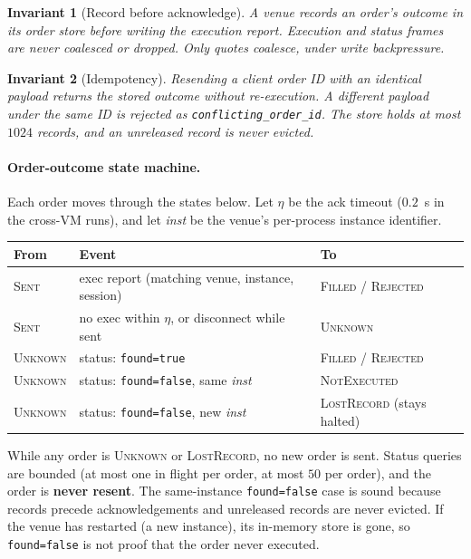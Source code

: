 \documentclass[11pt]{article}
\newtheorem{invariant}{Invariant}
\theoremstyle{remark}
\newcommand{\code}[1]{\texttt{#1}}
\begin{document}
\begin{invariant}[Record before acknowledge]
A venue records an order's outcome in its order store \emph{before} writing the execution
report. Execution and status frames are never coalesced or dropped. Only quotes coalesce, under
write backpressure.
\end{invariant}

\begin{invariant}[Idempotency]
Resending a client order ID with an identical payload returns the stored outcome without
re-execution. A different payload under the same ID is rejected as
\code{conflicting\_order\_id}. The store holds at most $1024$ records, and an unreleased record
is never evicted.
\end{invariant}

\paragraph{Order-outcome state machine.}
Each order moves through the states below. Let $\eta$ be the ack timeout ($0.2$~s in the
cross-VM runs), and let \textit{inst} be the venue's per-process instance identifier.

\begin{center}
\begin{tabular}{@{}lll@{}}
\toprule
From & Event & To \\
\midrule
\textsc{Sent}    & exec report (matching venue, instance, session) & \textsc{Filled} / \textsc{Rejected} \\
\textsc{Sent}    & no exec within $\eta$, or disconnect while sent & \textsc{Unknown} \\
\textsc{Unknown} & status: \code{found=true}                        & \textsc{Filled} / \textsc{Rejected} \\
\textsc{Unknown} & status: \code{found=false}, same \textit{inst}   & \textsc{NotExecuted} \\
\textsc{Unknown} & status: \code{found=false}, new \textit{inst}    & \textsc{LostRecord} (stays halted) \\
\bottomrule
\end{tabular}
\end{center}

\noindent While any order is \textsc{Unknown} or \textsc{LostRecord}, no new order is sent.
Status queries are bounded (at most one in flight per order, at most $50$ per order), and the
order is \textbf{never resent}. The same-instance \code{found=false} case is sound because
records precede acknowledgements and unreleased records are never evicted. If the venue has
restarted (a new instance), its in-memory store is gone, so \code{found=false} is not proof
that the order never executed.
\end{document}

